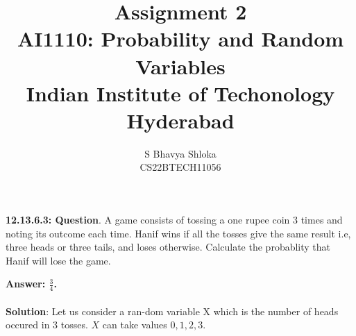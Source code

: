 \documentclass[journal,12pt]{IEEEtran}
\begin{document}
\let\vec\mathbf

\vspace{3cm}

\title{
\textbf {Assignment 2}\\ \large \textbf{AI1110}: Probability and Random Variables\\Indian Institute of Techonology Hyderabad
}
\author{S Bhavya Shloka\\CS22BTECH11056}
	

\maketitle

\newpage


\bigskip

\renewcommand{\thefigure}{\theenumi}
\renewcommand{\thetable}{\theenumi}


\textbf{12.13.6.3: Question}. A game consists of tossing a one rupee coin 3 times and noting its outcome each time. Hanif wins if all the tosses give the same result i.e, three heads or three tails, and loses otherwise. Calculate the probablity that Hanif will lose the game.

\textbf{Answer: $\frac{3}{4}$.}
\\\\
\textbf{Solution}:
Let us consider a ran-dom variable X which is the number of heads occured in 3 tosses.
$X$ can take values $0,1,2,3$.

\begin{table}[h]
\centering
{}
\end{table}
\end{document}
